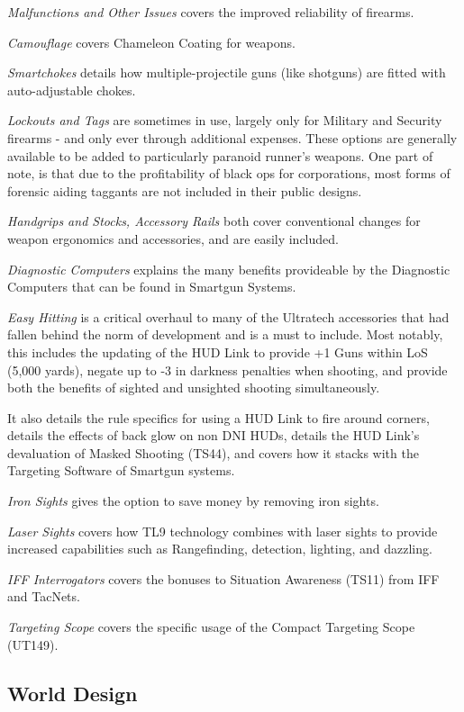 \begin{multicols*}{2}
	\textit{Malfunctions and Other Issues} covers the improved reliability of firearms.
	
	\textit{Camouflage} covers Chameleon Coating for weapons.
	
	\textit{Smartchokes} details how multiple-projectile guns (like shotguns) are fitted with auto-adjustable chokes.
	
	\textit{Lockouts and Tags} are sometimes in use, largely only for Military and Security firearms - and only ever through additional expenses. These options are generally available to be added to particularly paranoid runner's weapons. One part of note, is that due to the profitability of black ops for corporations, most forms of forensic aiding taggants are not included in their public designs.
	
	\textit{Handgrips and Stocks, Accessory Rails} both cover conventional changes for weapon ergonomics and accessories, and are easily included.
	
	\textit{Diagnostic Computers} explains the many benefits provideable by the Diagnostic Computers that can be found in Smartgun Systems.
	
	\textit{Easy Hitting} is a critical overhaul to many of the Ultratech accessories that had fallen behind the norm of development and is a must to include. Most notably, this includes the updating of the HUD Link to provide +1 Guns within LoS (5,000 yards), negate up to -3 in darkness penalties when shooting, and provide both the benefits of sighted and unsighted shooting simultaneously. 
	
	It also details the rule specifics for using a HUD Link to fire around corners, details the effects of back glow on non DNI HUDs, details the HUD Link's devaluation of Masked Shooting (TS44), and covers how it stacks with the Targeting Software of Smartgun systems.
	
	\textit{Iron Sights} gives the option to save money by removing iron sights.
	
	\textit{Laser Sights} covers how TL9 technology combines with laser sights to provide increased capabilities such as Rangefinding, detection, lighting, and dazzling.
	
	\textit{IFF Interrogators} covers the bonuses to Situation Awareness (TS11) from IFF and TacNets.
	
	\textit{Targeting Scope} covers the specific usage of the Compact Targeting Scope (UT149).
	
	\subsection{World Design}
	

\end{multicols*}
